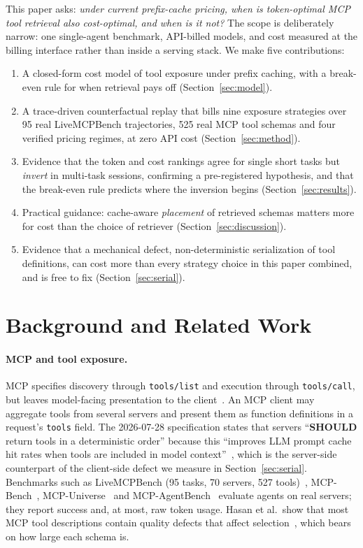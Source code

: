 \documentclass[11pt]{article}
\begin{document}
This paper asks: \emph{under current prefix-cache pricing, when is token-optimal MCP tool retrieval also cost-optimal, and when is it not?} The scope is deliberately narrow: one single-agent benchmark, API-billed models, and cost measured at the billing interface rather than inside a serving stack. We make five contributions:
\begin{enumerate}
\item A closed-form cost model of tool exposure under prefix caching, with a break-even rule for when retrieval pays off (Section~\ref{sec:model}).
\item A trace-driven counterfactual replay that bills nine exposure strategies over 95 real LiveMCPBench trajectories, 525 real MCP tool schemas and four verified pricing regimes, at zero API cost (Section~\ref{sec:method}).
\item Evidence that the token and cost rankings agree for single short tasks but \emph{invert} in multi-task sessions, confirming a pre-registered hypothesis, and that the break-even rule predicts where the inversion begins (Section~\ref{sec:results}).
\item Practical guidance: cache-aware \emph{placement} of retrieved schemas matters more for cost than the choice of retriever (Section~\ref{sec:discussion}).
\item Evidence that a mechanical defect, non-deterministic serialization of tool definitions, can cost more than every strategy choice in this paper combined, and is free to fix (Section~\ref{sec:serial}).
\end{enumerate}

\section{Background and Related Work}
\label{sec:related}
\paragraph{MCP and tool exposure.} MCP specifies discovery through \texttt{tools/list} and execution through \texttt{tools/call}, but leaves model-facing presentation to the client~\cite{mcpspec}. An MCP client may aggregate tools from several servers and present them as function definitions in a request's \texttt{tools} field. The 2026-07-28 specification states that servers ``\textbf{SHOULD} return tools in a deterministic order'' because this ``improves LLM prompt cache hit rates when tools are included in model context''~\cite{mcpspec}, which is the server-side counterpart of the client-side defect we measure in Section~\ref{sec:serial}. Benchmarks such as LiveMCPBench (95 tasks, 70 servers, 527 tools)~\cite{livemcpbench}, MCP-Bench~\cite{mcpbench}, MCP-Universe~\cite{mcpuniverse} and MCP-AgentBench~\cite{mcpagentbench} evaluate agents on real servers; they report success and, at most, raw token usage. Hasan et al.\ show that most MCP tool descriptions contain quality defects that affect selection~\cite{smelly}, which bears on how large each schema is.
\end{document}
